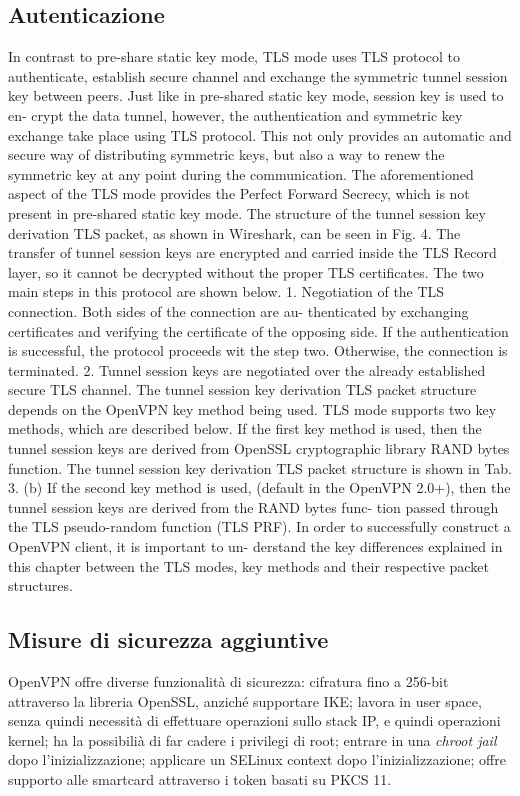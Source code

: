 \subsection{Autenticazione}
In contrast to pre-share static key mode, TLS mode uses TLS protocol to authenticate, establish secure channel and exchange the symmetric tunnel session key between peers.
Just like in pre-shared static key mode, session key is used to en- crypt the data tunnel, however, the authentication and symmetric key exchange take place using TLS protocol.
This not only provides an automatic and secure way of distributing symmetric keys, but also a way to renew the symmetric key at any point during the communication.
The aforementioned aspect of the TLS mode provides the Perfect Forward Secrecy, which is not present in pre-shared static key mode.
The structure of the tunnel session key derivation TLS packet, as shown in Wireshark, can be seen in Fig. 4.
The transfer of tunnel session keys are encrypted and carried inside the TLS Record layer, so it cannot be decrypted without the proper TLS certificates. The two main steps in this protocol are shown below.
1. Negotiation of the TLS connection. Both sides of the connection are au- thenticated by exchanging certificates and verifying the certificate of the opposing side. If the authentication is successful, the protocol proceeds wit the step two. Otherwise, the connection is terminated.
2. Tunnel session keys are negotiated over the already established secure TLS channel. The tunnel session key derivation TLS packet structure depends on the OpenVPN key method being used. TLS mode supports two key methods, which are described below.
If the first key method is used, then the tunnel session keys are derived from OpenSSL cryptographic library RAND bytes function.
The tunnel session key derivation TLS packet structure is shown in Tab. 3.
(b) If the second key method is used, (default in the OpenVPN 2.0+), then the tunnel session keys are derived from the RAND bytes func- tion passed through the TLS pseudo-random function (TLS PRF).
In order to successfully construct a OpenVPN client, it is important to un- derstand the key differences explained in this chapter between the TLS modes, key methods and their respective packet structures.

\subsection{Misure di sicurezza aggiuntive}
OpenVPN offre diverse funzionalità di sicurezza: cifratura fino a 256-bit attraverso la libreria OpenSSL, anziché supportare IKE; lavora in user space, senza quindi necessità di effettuare operazioni sullo stack IP, e quindi operazioni kernel; ha la possibilià di far cadere i privilegi di root; entrare in una \emph{chroot jail} dopo l'inizializzazione; applicare un SELinux context dopo l'inizializzazione; offre supporto alle smartcard attraverso i token basati su PKCS 11.


